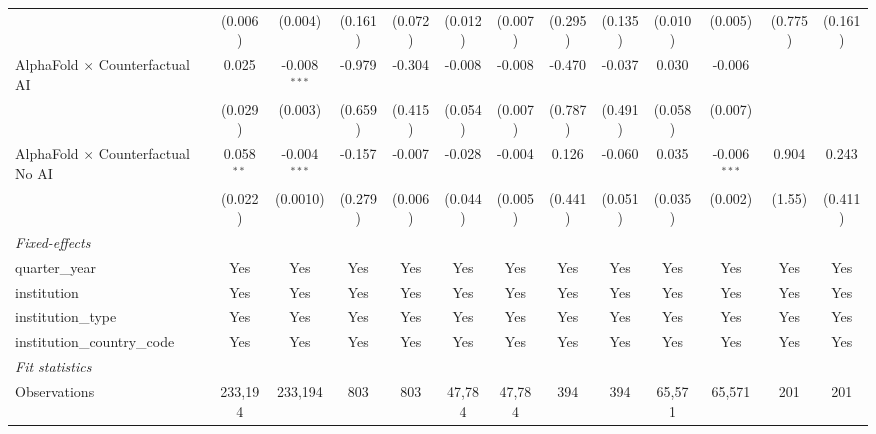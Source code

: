 \begin{tabular}{lcccccccccccc}
                                            & (0.006)       & (0.004)        & (0.161)       & (0.072)       & (0.012)       & (0.007)       & (0.295)     & (0.135) & (0.010)       & (0.005)        & (0.775) & (0.161)\\   
   AlphaFold $\times$ Counterfactual AI     & 0.025         & -0.008$^{***}$ & -0.979        & -0.304        & -0.008        & -0.008        & -0.470      & -0.037  & 0.030         & -0.006         &         &   \\   
                                            & (0.029)       & (0.003)        & (0.659)       & (0.415)       & (0.054)       & (0.007)       & (0.787)     & (0.491) & (0.058)       & (0.007)        &         &   \\   
   AlphaFold $\times$ Counterfactual No AI  & 0.058$^{**}$  & -0.004$^{***}$ & -0.157        & -0.007        & -0.028        & -0.004        & 0.126       & -0.060  & 0.035         & -0.006$^{***}$ & 0.904   & 0.243\\   
                                            & (0.022)       & (0.0010)       & (0.279)       & (0.006)       & (0.044)       & (0.005)       & (0.441)     & (0.051) & (0.035)       & (0.002)        & (1.55)  & (0.411)\\   
   \midrule
   \emph{Fixed-effects}\\
   quarter\_year                            & Yes           & Yes            & Yes           & Yes           & Yes           & Yes           & Yes         & Yes     & Yes           & Yes            & Yes     & Yes\\  
   institution                              & Yes           & Yes            & Yes           & Yes           & Yes           & Yes           & Yes         & Yes     & Yes           & Yes            & Yes     & Yes\\  
   institution\_type                        & Yes           & Yes            & Yes           & Yes           & Yes           & Yes           & Yes         & Yes     & Yes           & Yes            & Yes     & Yes\\  
   institution\_country\_code               & Yes           & Yes            & Yes           & Yes           & Yes           & Yes           & Yes         & Yes     & Yes           & Yes            & Yes     & Yes\\  
   \midrule
   \emph{Fit statistics}\\
   Observations                             & 233,194       & 233,194        & 803           & 803           & 47,784        & 47,784        & 394         & 394     & 65,571        & 65,571         & 201     & 201\\  

\end{tabular}

